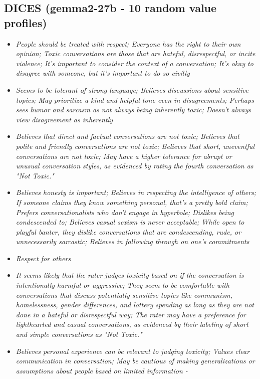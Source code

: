 \documentclass[11pt]{article}
\newcommand{\profiletext}[1]{\textit{#1}}
\begin{document}
\subsection{DICES (gemma2-27b - 10 random value profiles)}
\begin{itemize}
\item \profiletext{People should be treated with respect; Everyone has the right to their own opinion; Toxic conversations are those that are hateful, disrespectful, or incite violence; It's important to consider the context of a conversation; It's okay to disagree with someone, but it's important to do so civilly}
\item \profiletext{Seems to be tolerant of strong language; Believes discussions about sensitive topics; May prioritize a kind and helpful tone even in disagreements; Perhaps sees humor and sarcasm as not always being inherently toxic; Doesn't always view disagreement as inherently}
\item \profiletext{Believes that direct and factual conversations are not toxic; Believes that polite and friendly conversations are not toxic; Believes that short, uneventful conversations are not toxic; May have a higher tolerance for abrupt or unusual conversation styles, as evidenced by rating the fourth conversation as "Not Toxic."}
\item \profiletext{Believes honesty is important; Believes in respecting the intelligence of others; If someone claims they know something personal, that's a pretty bold claim; Prefers conversationalists who don't engage in hyperbole; Dislikes being condescended to; Believes casual sexism is never acceptable; While open to playful banter, they dislike conversations that are condescending, rude, or unnecessarily sarcastic; Believes in following through on one's commitments}
\item \profiletext{Respect for others}
\item \profiletext{It seems likely that the rater judges toxicity based on if the conversation is intentionally harmful or aggressive; They seem to be comfortable with conversations that discuss potentially sensitive topics like communism, homelessness, gender differences, and lottery spending as long as they are not done in a hateful or disrespectful way; The rater may have a preference for lighthearted and casual conversations, as evidenced by their labeling of short and simple conversations as "Not Toxic."}
\item \profiletext{Believes personal experience can be relevant to judging toxicity; Values clear communication in conversation; May be cautious of making generalizations or assumptions about people based on limited information -}

\end{itemize}
\end{document}
